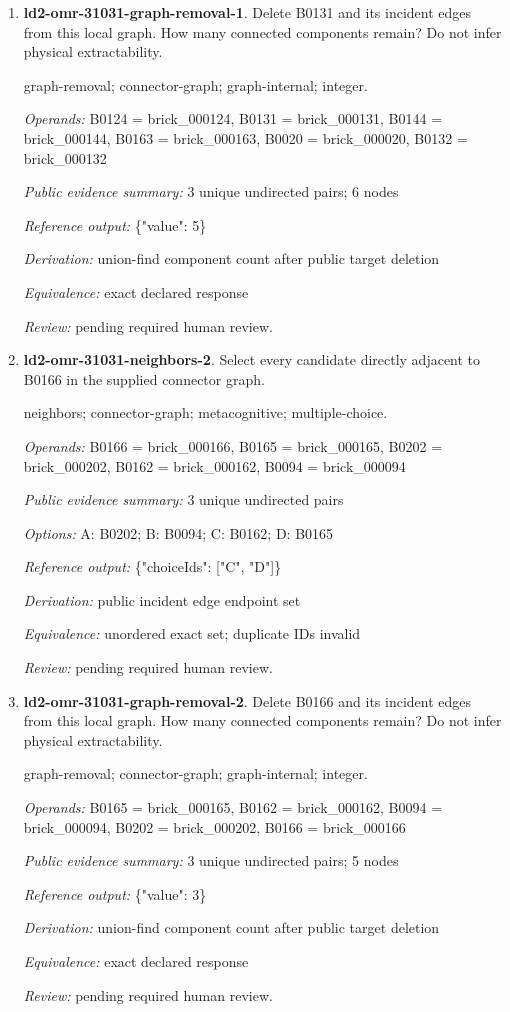\begin{enumerate}
\item \textbf{ld2-omr-31031-graph-removal-1}. Delete B0131 and its incident edges from this local graph. How many connected components remain? Do not infer physical extractability.
\par{\small graph-removal; connector-graph; graph-internal; integer.\par\textit{Operands:} B0124 = brick\_000124, B0131 = brick\_000131, B0144 = brick\_000144, B0163 = brick\_000163, B0020 = brick\_000020, B0132 = brick\_000132\par\textit{Public evidence summary:} 3 unique undirected pairs; 6 nodes\par\textit{Reference output:} \{"value": 5\}\par\textit{Derivation:} union-find component count after public target deletion\par\textit{Equivalence:} exact declared response\par\textit{Review:} pending required human review.}
\item \textbf{ld2-omr-31031-neighbors-2}. Select every candidate directly adjacent to B0166 in the supplied connector graph.
\par{\small neighbors; connector-graph; metacognitive; multiple-choice.\par\textit{Operands:} B0166 = brick\_000166, B0165 = brick\_000165, B0202 = brick\_000202, B0162 = brick\_000162, B0094 = brick\_000094\par\textit{Public evidence summary:} 3 unique undirected pairs\par\textit{Options:} A: B0202; B: B0094; C: B0162; D: B0165\par\textit{Reference output:} \{"choiceIds": ["C", "D"]\}\par\textit{Derivation:} public incident edge endpoint set\par\textit{Equivalence:} unordered exact set; duplicate IDs invalid\par\textit{Review:} pending required human review.}
\item \textbf{ld2-omr-31031-graph-removal-2}. Delete B0166 and its incident edges from this local graph. How many connected components remain? Do not infer physical extractability.
\par{\small graph-removal; connector-graph; graph-internal; integer.\par\textit{Operands:} B0165 = brick\_000165, B0162 = brick\_000162, B0094 = brick\_000094, B0202 = brick\_000202, B0166 = brick\_000166\par\textit{Public evidence summary:} 3 unique undirected pairs; 5 nodes\par\textit{Reference output:} \{"value": 3\}\par\textit{Derivation:} union-find component count after public target deletion\par\textit{Equivalence:} exact declared response\par\textit{Review:} pending required human review.}

\end{enumerate}
